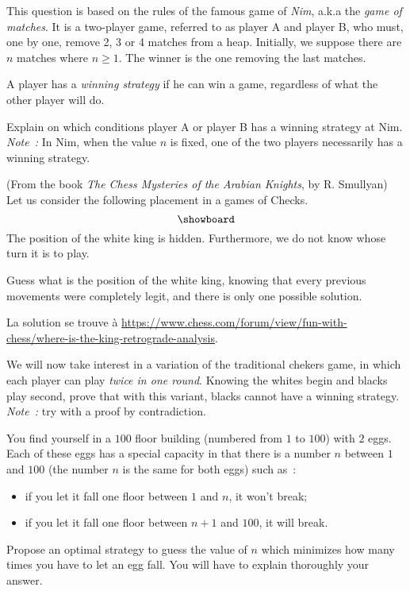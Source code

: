 \documentclass[12pt,addpoints]{exam}
\begin{document}
\begin{questions}
\question
This question is based on the rules of the famous game of \emph{Nim}, a.k.a the \emph{game of matches}.
It is a two-player game, referred to as player A and player B, who must, one by one, remove 2, 3 or 4 matches from a heap.
Initially, we suppose there are $n$ matches where $n \geq 1$. The winner is the one removing the last matches.

A player has a \emph{winning strategy} if he can win a game, regardless of what the other player will do.

Explain on which conditions player A or player B has a winning strategy at Nim. \emph{Note~:} In Nim, when the value $n$ is fixed, one of the two players necessarily has a winning strategy.

\question
(From the book \emph{The Chess Mysteries of the Arabian Knights}, by R. Smullyan) Let us consider the following placement in a games of Checks.
\[ \showboard \]
The position of the white king is hidden. Furthermore, we do not know whose turn it is to play.

Guess what is the position of the white king, knowing that every previous movements were completely legit, and there is only one possible solution.
\begin{solution}
La solution se trouve à \href{https://www.chess.com/forum/view/fun-with-chess/where-is-the-king-retrograde-analysis}{https://www.chess.com/forum/view/fun-with-chess/where-is-the-king-retrograde-analysis}.
\end{solution}

\question
We will now take interest in a variation of the traditional chekers game, in which each player can play \emph{twice in one round}.
Knowing the whites begin and blacks play second, prove that with this variant, blacks cannot have a winning strategy.
\emph{Note~:} try with a proof by contradiction.

\question
You find yourself in a $100$ floor building (numbered from $1$ to $100$) with $2$ eggs.
Each of these eggs has a special capacity in that there is a number $n$ between $1$ and $100$ (the number $n$ is the same for both eggs) such as~:
\begin{itemize}
  \item if you let it fall one floor between $1$ and $n$, it won't break;
  \item if you let it fall one floor between $n + 1$ and $100$, it will break.
\end{itemize}
Propose an optimal strategy to guess the value of $n$ which minimizes how many times you have to let an egg fall. You will have to explain thoroughly your answer.


\end{questions}
\end{document}
